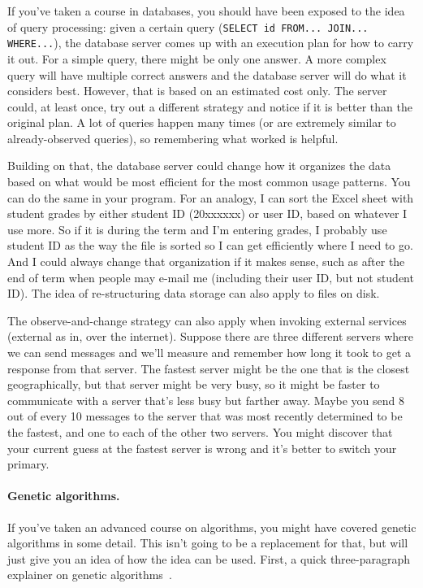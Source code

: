 If you've taken a course in databases, you should have been exposed to the idea of query processing: given a certain query (\texttt{SELECT id FROM... JOIN... WHERE...}), the database server comes up with an execution plan for how to carry it out. For a simple query, there might be only one answer. A more complex query will have multiple correct answers and the database server will do what it considers best. However, that is based on an estimated cost only. The server could, at least once, try out a different strategy and notice if it is better than the original plan. A lot of queries happen many times (or are extremely similar to already-observed queries), so remembering what worked is helpful.

Building on that, the database server could change how it organizes the data based on what would be most efficient for the most common usage patterns. You can do the same in your program. For an analogy, I can sort the Excel sheet with student grades by either student ID (20xxxxxx) or user ID, based on whatever I use more. So if it is during the term and I'm entering grades, I probably use student ID as the way the file is sorted so I can get efficiently where I need to go. And I could always change that organization if it makes sense, such as after the end of term when people may e-mail me (including their user ID, but not student ID). The idea of re-structuring data storage can also apply to files on disk.

The observe-and-change strategy can also apply when invoking external services (external as in, over the internet). Suppose there are three different servers where we can send messages and we'll measure and remember how long it took to get a response from that server. The fastest server might be the one that is the closest geographically, but that server might be very busy, so it might be faster to communicate with a server that's less busy but farther away. Maybe you send 8 out of every 10 messages to the server that was most recently determined to be the fastest, and one to each of the other two servers. You might discover that your current guess at the fastest server is wrong and it's better to switch your primary.


\paragraph{Genetic algorithms.}
If you've taken an advanced course on algorithms, you might have covered genetic algorithms in some detail. This isn't going to be a replacement for that, but will just give you an idea of how the idea can be used. First, a quick three-paragraph explainer on genetic algorithms~\cite{genetic}.

